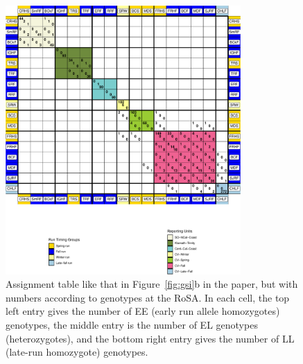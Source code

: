 \begin{figure}
\begin{center}
\includegraphics[width=0.8\textwidth]{images/rosa-gsi-table-crop.pdf}
\end{center}
\caption[Assignment table by RoSA genotype]{\footnotesize Assignment table
like that in Figure~\ref{fig:gsi}b in the paper, but with numbers according to genotypes
at the RoSA. In each cell, the top left entry gives the number of EE (early run allele homozygotes)
genotypes, the middle entry is the number of EL genotypes (heterozygotes), and the bottom
right entry gives the number of LL (late-run homozygote) genotypes. }
\label{fig:rosa-gsi}
\end{figure}



